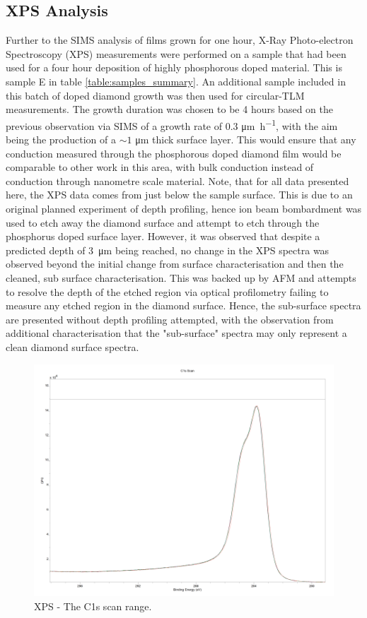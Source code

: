 \begin{refsection}
\subsection{XPS Analysis}
Further to the SIMS analysis of films grown for one hour, X-Ray Photo-electron Spectroscopy (XPS) measurements were performed on a sample that had been used for a four hour deposition of highly phosphorous doped material. This is sample E in table \ref{table:samples_summary}. An additional sample included in this batch of doped diamond growth was then used for circular-TLM measurements. The growth duration was chosen to be 4 hours based on the previous observation via SIMS of a growth rate of 0.3 \si{\micro\metre\per\hour}, with the aim being the production of a $\sim1$ \si{\micro\metre} thick surface layer. This would ensure that any conduction measured through the phosphorous doped diamond film would be comparable to other work in this area, with bulk conduction instead of conduction through nanometre scale material. Note, that for all data presented here, the XPS data comes from just below the sample surface. This is due to an original planned experiment of depth profiling, hence ion beam bombardment was used to etch away the diamond surface and attempt to etch through the phosphorus doped surface layer. However, it was observed that despite a predicted depth of 3~\si{\micro\metre} being reached, no change in the XPS spectra was observed beyond the initial change from surface characterisation and then the cleaned, sub surface characterisation. This was backed up by AFM and attempts to resolve the depth of the etched region via optical profilometry failing to measure any etched region in the diamond surface. Hence, the sub-surface spectra are presented without depth profiling attempted, with the observation from additional characterisation that the "sub-surface" spectra may only represent a clean diamond surface spectra.

\begin{figure}[H]
    \centering
    \includegraphics[width=\textwidth]{Chapter3/Figs/xps_c1s.png}
    \caption{XPS - The C1s scan range.}
    \label{fig:xps_c1s}
\end{figure}


\end{refsection}
